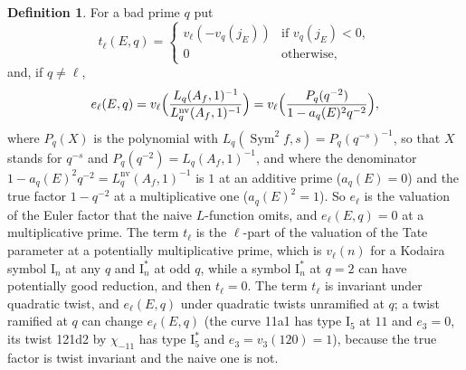 \documentclass[11pt]{amsart}
\theoremstyle{definition}
\newtheorem{definition}[theorem]{Definition}
\newcommand{\Sym}{\operatorname{Sym}^2}
\newcommand{\nv}{\mathrm{nv}}
\begin{document}
\begin{definition}\label{def:terms}
For a bad prime $q$ put
\[
t_\ell(E,q)=\begin{cases}v_\ell(-v_q(j_E))&\text{if }v_q(j_E)<0,\\0&\text{otherwise,}\end{cases}
\]
and, if $q\ne\ell$,
\[
e_\ell(E,q)=v_\ell\Bigl(\frac{L_q(A_f,1)^{-1}}{L_q^{\nv}(A_f,1)^{-1}}\Bigr)=v_\ell\Bigl(\frac{P_q(q^{-2})}{1-a_q(E)^2q^{-2}}\Bigr),
\]
where $P_q(X)$ is the polynomial with $L_q(\Sym f,s)=P_q(q^{-s})^{-1}$, so that $X$ stands for $q^{-s}$ and $P_q(q^{-2})=L_q(A_f,1)^{-1}$, and where the denominator $1-a_q(E)^2q^{-2}=L_q^{\nv}(A_f,1)^{-1}$ is $1$ at an additive prime ($a_q(E)=0$) and the true factor $1-q^{-2}$ at a multiplicative one ($a_q(E)^2=1$). So $e_\ell$ is the valuation of the Euler factor that the naive $L$-function omits, and $e_\ell(E,q)=0$ at a multiplicative prime. The term $t_\ell$ is the $\ell$-part of the valuation of the Tate parameter at a potentially multiplicative prime, which is $v_\ell(n)$ for a Kodaira symbol $\mathrm{I}_n$ at any $q$ and $\mathrm{I}_n^*$ at odd $q$, while a symbol $\mathrm{I}_n^*$ at $q=2$ can have potentially good reduction, and then $t_\ell=0$. The term $t_\ell$ is invariant under quadratic twist, and $e_\ell(E,q)$ under quadratic twists unramified at $q$; a twist ramified at $q$ can change $e_\ell(E,q)$ (the curve 11a1 has type $\mathrm{I}_5$ at $11$ and $e_3=0$, its twist 121d2 by $\chi_{-11}$ has type $\mathrm{I}_5^*$ and $e_3=v_3(120)=1$), because the true factor is twist invariant and the naive one is not.
\end{definition}
\end{document}
